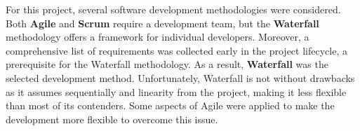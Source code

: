\documentclass{l4proj}
\begin{document}






For this project, several software development methodologies were considered. Both \textbf{Agile} and \textbf{Scrum} require a development team, but the \textbf{Waterfall} methodology offers a framework for individual developers. Moreover, a comprehensive list of requirements was collected early in the project lifecycle, a prerequisite for the Waterfall methodology. As a result, \textbf{Waterfall} was the selected development method. Unfortunately, Waterfall is not without drawbacks as it assumes sequentially and linearity from the project, making it less flexible than most of its contenders. Some aspects of Agile were applied to make the development more flexible to overcome this issue.
\end{document}
